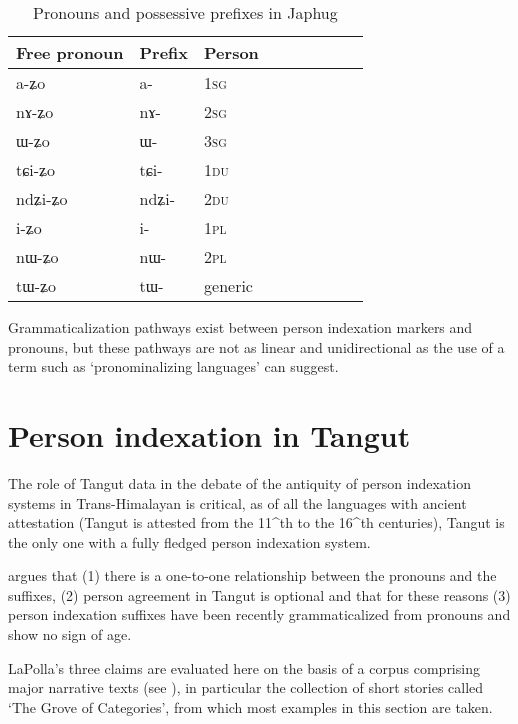 \documentclass[oldfontcommands,oneside,a4paper,11pt]{article}
\newcommand{\ipa}[1]{{\phon \mbox{#1}}} %
\begin{document}
 \begin{table}[H] \centering
\caption{Pronouns and possessive prefixes in Japhug}\label{tab:pronoun}
\begin{tabular}{lllllllll} 
\toprule
 Free pronoun & Prefix & Person\\
\midrule
 \ipa{a-ʑo}  &	\ipa{a-}  &		1\textsc{sg} \\
\ipa{nɤ-ʑo}  &	\ipa{nɤ-}  &			2\textsc{sg}\\
\ipa{ɯ-ʑo}  &	\ipa{ɯ-}  &			3\textsc{sg}\\
\midrule
\ipa{tɕi-ʑo}  &	\ipa{tɕi-}  &			1\textsc{du} \\
\ipa{ndʑi-ʑo}  &	\ipa{ndʑi-}  &		2\textsc{du} \\	
\midrule
\ipa{i-ʑo}    &	\ipa{i-}  &			1\textsc{pl} \\
\ipa{nɯ-ʑo}   &	\ipa{nɯ-}  &			2\textsc{pl} \\
\midrule
\ipa{tɯ-ʑo} & \ipa{tɯ-}   &  generic\\
\bottomrule
\end{tabular}
\end{table}

 Grammaticalization pathways exist between person indexation markers and pronouns, but these pathways are not as linear and unidirectional as the use of a term such as `pronominalizing languages' can suggest.  

\section{Person indexation in Tangut}
The role of Tangut data in the debate of the antiquity of person indexation systems in Trans-Himalayan is critical, as of all the languages with ancient attestation (Tangut is attested from the 11^{th} to the 16^{th} centuries), Tangut is the only one with a fully fledged person indexation system.



\citet{lapolla92} argues that (1) there is a one-to-one relationship between the pronouns and the suffixes, (2) person agreement in Tangut is optional and that for these reasons (3) person indexation suffixes have been recently grammaticalized from pronouns and show no sign of age.  

LaPolla's three claims are evaluated here on the basis of a corpus comprising major narrative texts (see \citealt[8-9]{jacques14esquisse}), in particular the collection of short stories called  `The Grove of Categories', from which most examples in this section are taken.
\end{document}
